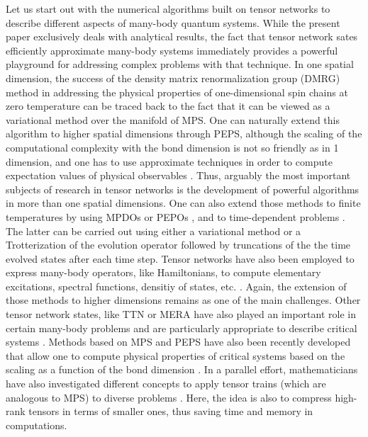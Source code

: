 \documentclass[rmp,aps,reprint,superscriptaddress,nobalancelastpage]{revtex4-1}
\begin{document}
    Let us start out with the numerical algorithms built on tensor networks to describe different aspects of many-body quantum systems. While the present paper exclusively deals with analytical results, the fact that tensor network sates efficiently approximate many-body systems immediately provides a powerful playground for addressing complex problems with that technique. In one spatial dimension, the success of the density matrix renormalization group (DMRG) \cite{white:DMRG} method in addressing the physical properties of one-dimensional spin chains at zero temperature can be traced back to the fact that it can be viewed as a variational method over the manifold of MPS. One can naturally extend this algorithm to higher spatial dimensions through PEPS, although the scaling of the computational complexity with the bond dimension is not so friendly as in 1 dimension, and one has to use approximate techniques in order to compute expectation values of physical observables \cite{verstraete:2D-dmrg}. Thus, arguably the most important subjects of research in tensor networks is the development of powerful algorithms in more than one spatial dimensions. One can also extend those methods to finite temperatures by using MPDOs or PEPOs \cite{czarnik2015variational}, and to time-dependent problems \cite{czarnik2019time}. The latter can be carried out using either a variational method or a Trotterization of the evolution operator followed by truncations of the the time evolved states after each time step. Tensor networks have also been employed to express many-body operators, like Hamiltonians, to compute elementary excitations, spectral functions, densitiy of states, etc. \cite{pirvu2010matrix,mcculloch2007density}. Again, the extension of those methods to higher dimensions remains as one of the main challenges. Other tensor network states, like TTN or MERA have also played an important role in certain many-body problems and are particularly appropriate to describe critical systems \cite{evenbly2014algorithms,silvi2010homogeneous}. Methods based on MPS and PEPS have also been recently developed that allow one to compute physical properties of critical systems based on the scaling as a function of the bond dimension \cite{vanhecke2019scaling,tagliacozzo2008scaling,corboz2018finite,pirvu2012matrix,rader2018finite,stojevic2015conformal}. In a parallel effort, mathematicians have also investigated different concepts to apply tensor trains (which are analogous to MPS) to diverse problems \cite{oseledets2011tensor,hackbusch2012tensor,grasedyck2010hierarchical}. Here, the idea is also to compress high-rank tensors in terms of smaller ones, thus saving time and memory in computations.
\end{document}
